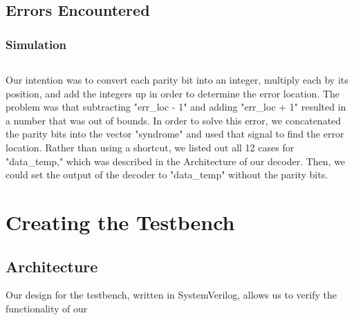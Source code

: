 \documentclass[paper=letter, fontsize=11pt]{scrartcl}
\numberwithin{equation}{section} %
\numberwithin{figure}{section} %
\numberwithin{table}{section} %
\begin{document}
\subsection{Errors Encountered}

\subsubsection{Simulation}
\begin{verbatim}

\end{verbatim} 

Our intention was to convert each parity bit into an integer, multiply each by its position, and add the integers up in order to determine the error location. The problem was that subtracting "err\_loc - 1" and adding "err\_loc + 1" resulted in a number that was out of bounds. In order to solve this error, we concatenated the parity bits into the vector "syndrome" and used that signal to find the error location. Rather than using a shortcut, we listed out all 12 cases for "data\_temp," which was described in the Architecture of our decoder. Then, we could set the output of the decoder to "data\_temp" without the parity bits.\\[20pt] 

\section{Creating the Testbench}

\subsection{Architecture}
\begin{flushleft}
	Our design for the testbench, written in SystemVerilog, allows us to verify the functionality of our 
	         
\end{flushleft}
\end{document}
